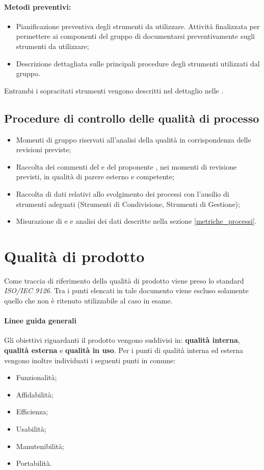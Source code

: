 \documentclass[12pt,a4paper]{article}
\begin{document}
\paragraph{Metodi preventivi:}
\begin{itemize}
	\item Pianificazione preventiva degli strumenti da utilizzare. Attività finalizzata per permettere ai componenti del gruppo di documentarsi preventivamente sugli strumenti da utilizzare;
	\item Descrizione dettagliata sulle principali procedure degli strumenti utilizzati dal gruppo.
\end{itemize}
Entrambi i sopracitati strumenti vengono descritti nel dettaglio nelle \NdP{}.


\subsection{Procedure di controllo delle qualità di processo}
\begin{itemize}
	\item Momenti di gruppo riservati all'analisi della qualità in corrispondenza delle revisioni previste;
	\item Raccolta dei commenti del \Vardanega{} e del proponente \Zucchetti{}, nei momenti di revisione previsti, in qualità di parere esterno e competente;
	\item Raccolta di dati relativi allo svolgimento dei processi con l'ausilio di strumenti adeguati (Strumenti di Condivisione, Strumenti di Gestione);
	\item Misurazione di  e  e analisi dei dati descritte nella sezione \ref{metriche_processi}.	
\end{itemize}

\newpage

\section{Qualità di prodotto}
Come traccia di riferimento della qualità di prodotto viene preso lo standard \textit{ISO/IEC 9126}. Tra i punti elencati in tale documento viene escluso solamente quello che non è ritenuto utilizzabile al caso in esame.
\paragraph{Linee guida generali}
Gli obiettivi riguardanti il prodotto vengono suddivisi in: \textbf{qualità interna}, \textbf{qualità esterna} e \textbf{qualità in uso}.
Per i punti di qualità interna ed esterna vengono inoltre individuati i seguenti punti in comune:
\begin{itemize}
	\item Funzionalità;
	\item Affidabilità;
	\item Efficienza;
	\item Usabilità;
	\item Manutenibilità;
	\item Portabilità.
\end{itemize}
\end{document}
